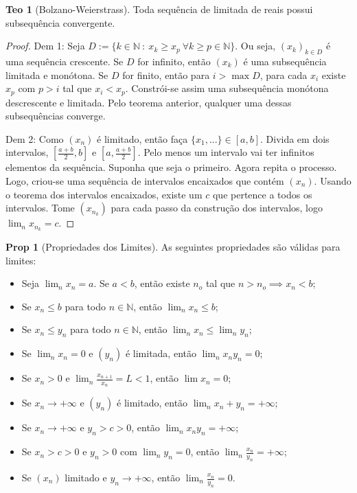 \documentclass[journal, letterpaper]{IEEEtran}
\theoremstyle{definition}
\newtheorem{theorem}{Teo}
\newtheorem{proposition}{Prop}
\begin{document}
\begin{theorem}[Bolzano-Weierstrass]
	Toda sequência de limitada de reais possui subsequência convergente.
\end{theorem}
\begin{proof}
	Dem 1: Seja $D:=\{k \in \mathbb N \ : \ x_k \geq x_p \ \forall k \geq p \in \mathbb N \}$. Ou seja, $(x_k)_{k\in D}$ é
	uma sequência crescente. Se $D$ for infinito, então $(x_k)$ é uma subsequência limitada e monótona.
	Se $D$ for finito, então para $i > \max D$, para cada $x_i$ existe $x_p$ com $p > i$ tal que
	$x_i < x_p$. Constrói-se assim uma subsequência monótona descrescente e limitada. Pelo teorema anterior, qualquer
	uma dessas subsequências converge.

	Dem 2: Como $(x_n)$ é limitado, então faça $\{x_1,...\} \in [a,b]$. Divida em dois intervalos,
	$[\frac{a+b}{2},b]$ e $[a,\frac{a+b}{2}]$. Pelo menos um intervalo vai ter infinitos elementos da sequência.
	Suponha que seja o primeiro. Agora repita o processo. Logo, criou-se uma sequência de intervalos
	encaixados que contém $(x_n)$. Usando o teorema dos intervalos encaixados, existe um $c$ que pertence
	a todos os intervalos. Tome $(x_{n_k})$ para cada passo da construção dos intervalos, logo
	$\lim_n x_{n_k} = c$.
\end{proof}

\begin{proposition}[Propriedades dos Limites]
	As seguintes propriedades são válidas para limites:
	\begin{itemize}
		\item Seja $\lim_n x_n = a$. Se $a<b$, então existe $n_o$ tal que $n>n_o \implies x_n < b$;
		\item Se $x_n \leq b$ para todo $n \in \mathbb N$, então $\lim_n x_n \leq b$;
		\item Se $x_n \leq y_n$ para todo $n \in \mathbb N$, então $\lim_n x_n \leq \lim_n y_n$;
		\item Se $\lim_n x_n = 0$ e $(y_n)$ é limitada, então $\lim_n x_n y_n =0 $;
		\item Se $x_n>0$ e $\lim_n \frac{x_{n+1}}{x_n} = L < 1$, então $\lim x_n = 0$;
		\item Se $x_n \to +\infty$ e $(y_n)$ é limitado, então $\lim_n x_n + y_n = +\infty$;
		\item Se $x_n \to +\infty$ e $y_n > c > 0$, então $\lim_n x_n y_n = +\infty$;
		\item Se $x_n > c >0$ e $y_n >0$ com $\lim_n y_n = 0$, então $\lim_n \frac{x_n}{y_n}= +\infty$;
		\item Se $(x_n)$ limitado e $y_n \to +\infty$, então $\lim_n \frac{x_n}{y_n} = 0$.
	\end{itemize}
\end{proposition}
\end{document}

